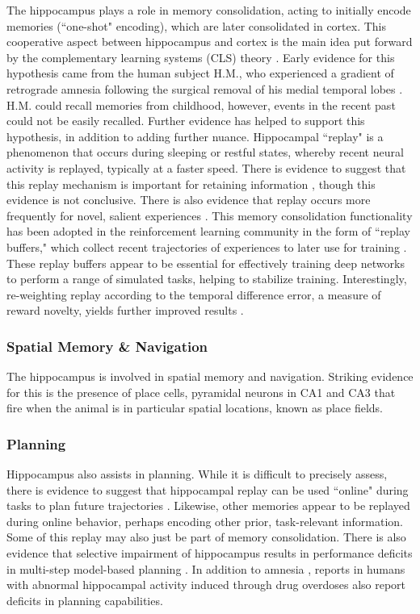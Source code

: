 The hippocampus plays a role in memory consolidation, acting to initially encode memories (``one-shot" encoding), which are later consolidated in cortex. This cooperative aspect between hippocampus and cortex is the main idea put forward by the complementary learning systems (CLS) theory \cite{mcclelland1995there, kumaran2016learning}. Early evidence for this hypothesis came from the human subject H.M., who experienced a gradient of retrograde amnesia following the surgical removal of his medial temporal lobes \cite{penfield1958memory}. H.M. could recall memories from childhood, however, events in the recent past could not be easily recalled. Further evidence has helped to support this hypothesis, in addition to adding further nuance. Hippocampal ``replay" is a phenomenon that occurs during sleeping or restful states, whereby recent neural activity is replayed, typically at a faster speed. There is evidence to suggest that this replay mechanism is important for retaining information \cite{girardeau2009selective}, though this evidence is not conclusive. There is also evidence that replay occurs more frequently for novel, salient experiences \cite{foster2006reverse, singer2009rewarded}. This memory consolidation functionality has been adopted in the reinforcement learning community in the form of ``replay buffers," which collect recent trajectories of experiences to later use for training \cite{mnih2013playing}. These replay buffers appear to be essential for effectively training deep networks to perform a range of simulated tasks, helping to stabilize training. Interestingly, re-weighting replay according to the temporal difference error, a measure of reward novelty, yields further improved results \cite{schaul2015prioritized}.


\subsubsection{Spatial Memory \& Navigation}

The hippocampus is involved in spatial memory and navigation. Striking evidence for this is the presence of place cells, pyramidal neurons in CA1 and CA3 that fire when the animal is in particular spatial locations, known as place fields. 


\subsubsection{Planning}

Hippocampus also assists in planning. While it is difficult to precisely assess, there is evidence to suggest that hippocampal replay can be used ``online" during tasks to plan future trajectories \cite{o2010play, olafsdottir2018role}. Likewise, other memories appear to be replayed during online behavior, perhaps encoding other prior, task-relevant information. Some of this replay may also just be part of memory consolidation. There is also evidence that selective impairment of hippocampus results in performance deficits in multi-step model-based planning \cite{miller2017dorsal}. In addition to amnesia \cite{barash2018acute}, reports in humans with abnormal hippocampal activity induced through drug overdoses also report deficits in planning capabilities.


